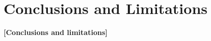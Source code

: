 \documentclass[letterpaper, 10 pt, conference]{ieeeconf}
\newcommand{\todo}[1]{\textbf{[#1]}}
\begin{document}
\section{Conclusions and Limitations}
\label{sec:conclusion}

\todo{Conclusions and limitations}





\end{document}
